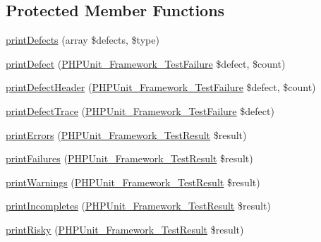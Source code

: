 \subsection*{Protected Member Functions}
\begin{DoxyCompactItemize}
\item 
\mbox{\hyperlink{class_p_h_p_unit___text_u_i___result_printer_a5dfc558d612bdcb773ac988b2e637261}{print\+Defects}} (array \$defects, \$type)
\item 
\mbox{\hyperlink{class_p_h_p_unit___text_u_i___result_printer_a044cd2142c59e9c306b4f3adeedfe9fd}{print\+Defect}} (\mbox{\hyperlink{class_p_h_p_unit___framework___test_failure}{P\+H\+P\+Unit\+\_\+\+Framework\+\_\+\+Test\+Failure}} \$defect, \$count)
\item 
\mbox{\hyperlink{class_p_h_p_unit___text_u_i___result_printer_a415d53b69702ba40f80efa7b7df48472}{print\+Defect\+Header}} (\mbox{\hyperlink{class_p_h_p_unit___framework___test_failure}{P\+H\+P\+Unit\+\_\+\+Framework\+\_\+\+Test\+Failure}} \$defect, \$count)
\item 
\mbox{\hyperlink{class_p_h_p_unit___text_u_i___result_printer_a2f6e2b2674d2a617d30f7f563e1a4550}{print\+Defect\+Trace}} (\mbox{\hyperlink{class_p_h_p_unit___framework___test_failure}{P\+H\+P\+Unit\+\_\+\+Framework\+\_\+\+Test\+Failure}} \$defect)
\item 
\mbox{\hyperlink{class_p_h_p_unit___text_u_i___result_printer_a9a1da341042f7390084b71daf14e849e}{print\+Errors}} (\mbox{\hyperlink{class_p_h_p_unit___framework___test_result}{P\+H\+P\+Unit\+\_\+\+Framework\+\_\+\+Test\+Result}} \$result)
\item 
\mbox{\hyperlink{class_p_h_p_unit___text_u_i___result_printer_ab40a908faef35c94529c4cba18c49835}{print\+Failures}} (\mbox{\hyperlink{class_p_h_p_unit___framework___test_result}{P\+H\+P\+Unit\+\_\+\+Framework\+\_\+\+Test\+Result}} \$result)
\item 
\mbox{\hyperlink{class_p_h_p_unit___text_u_i___result_printer_a94f881a4cf6840108fec713af0d205cf}{print\+Warnings}} (\mbox{\hyperlink{class_p_h_p_unit___framework___test_result}{P\+H\+P\+Unit\+\_\+\+Framework\+\_\+\+Test\+Result}} \$result)
\item 
\mbox{\hyperlink{class_p_h_p_unit___text_u_i___result_printer_a48c1df90664991e1af687f85ff0ea1f9}{print\+Incompletes}} (\mbox{\hyperlink{class_p_h_p_unit___framework___test_result}{P\+H\+P\+Unit\+\_\+\+Framework\+\_\+\+Test\+Result}} \$result)
\item 
\mbox{\hyperlink{class_p_h_p_unit___text_u_i___result_printer_a8937854917d76a1807f303c3a4e70fb6}{print\+Risky}} (\mbox{\hyperlink{class_p_h_p_unit___framework___test_result}{P\+H\+P\+Unit\+\_\+\+Framework\+\_\+\+Test\+Result}} \$result)

\end{DoxyCompactItemize}
